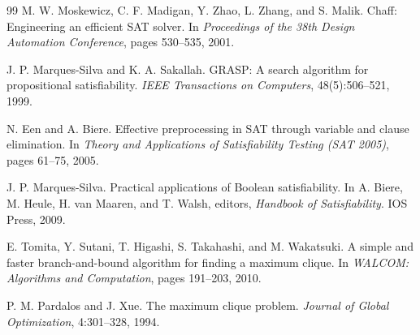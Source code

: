 \documentclass[a4paper,12pt]{article}
\theoremstyle{definition}
\begin{document}
\begin{thebibliography}{99}
  M. W. Moskewicz, C. F. Madigan, Y. Zhao, L. Zhang, and S. Malik.
  Chaff: Engineering an efficient SAT solver.
  In \emph{Proceedings of the 38th Design Automation Conference},
  pages 530--535, 2001.

  J. P. Marques-Silva and K. A. Sakallah.
  GRASP: A search algorithm for propositional satisfiability.
  \emph{IEEE Transactions on Computers}, 48(5):506--521, 1999.

  N. Een and A. Biere. Effective preprocessing in SAT through variable and
  clause elimination. In \emph{Theory and Applications of Satisfiability
  Testing (SAT 2005)}, pages 61--75, 2005.

  J. P. Marques-Silva. Practical applications of Boolean satisfiability.
  In A. Biere, M. Heule, H. van Maaren, and T. Walsh, editors,
  \emph{Handbook of Satisfiability}. IOS Press, 2009.

  E. Tomita, Y. Sutani, T. Higashi, S. Takahashi, and M. Wakatsuki.
  A simple and faster branch-and-bound algorithm for finding a maximum clique.
  In \emph{WALCOM: Algorithms and Computation}, pages 191--203, 2010.

  P. M. Pardalos and J. Xue. The maximum clique problem.
  \emph{Journal of Global Optimization}, 4:301--328, 1994.

\end{thebibliography}
\end{document}
